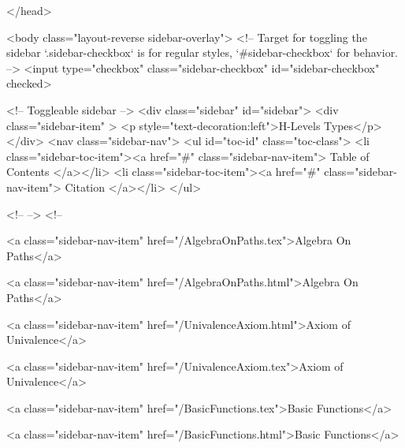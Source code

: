   
</head>




  <body class="layout-reverse sidebar-overlay">
    <!-- Target for toggling the sidebar `.sidebar-checkbox` is for regular
     styles, `#sidebar-checkbox` for behavior. -->
<input type="checkbox" class="sidebar-checkbox" id="sidebar-checkbox" checked>

<!-- Toggleable sidebar -->
<div class="sidebar" id="sidebar">
  <div class="sidebar-item" >
    <p style="text-decoration:left">H-Levels Types</p>
  </div>
  <nav class="sidebar-nav">
    <ul id="toc-id" class="toc-class">
  <li class="sidebar-toc-item"><a href="#" class="sidebar-nav-item"> Table of Contents </a></li>
  <li class="sidebar-toc-item"><a href="#" class="sidebar-nav-item"> Citation </a></li>
</ul>


    <!--  -->
    <!-- 
      
    
      
    
      
    
      
        
      
    
      
        
          <a class="sidebar-nav-item" href="/AlgebraOnPaths.tex">Algebra On Paths</a>
        
      
    
      
        
          <a class="sidebar-nav-item" href="/AlgebraOnPaths.html">Algebra On Paths</a>
        
      
    
      
        
          <a class="sidebar-nav-item" href="/UnivalenceAxiom.html">Axiom of Univalence</a>
        
      
    
      
        
          <a class="sidebar-nav-item" href="/UnivalenceAxiom.tex">Axiom of Univalence</a>
        
      
    
      
        
          <a class="sidebar-nav-item" href="/BasicFunctions.tex">Basic Functions</a>
        
      
    
      
        
          <a class="sidebar-nav-item" href="/BasicFunctions.html">Basic Functions</a>
        
      
    
